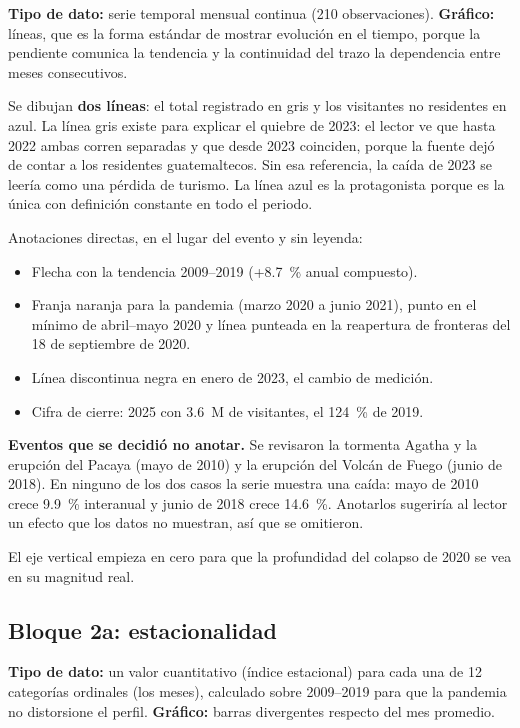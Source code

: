 \documentclass[12pt,letterpaper]{article}
\begin{document}
\textbf{Tipo de dato:} serie temporal mensual continua (210 observaciones). \textbf{Gráfico:}
líneas, que es la forma estándar de mostrar evolución en el tiempo, porque la pendiente comunica
la tendencia y la continuidad del trazo la dependencia entre meses consecutivos.

Se dibujan \textbf{dos líneas}: el total registrado en gris y los visitantes no residentes en
azul. La línea gris existe para explicar el quiebre de 2023: el lector ve que hasta 2022 ambas
corren separadas y que desde 2023 coinciden, porque la fuente dejó de contar a los residentes
guatemaltecos. Sin esa referencia, la caída de 2023 se leería como una pérdida de turismo. La
línea azul es la protagonista porque es la única con definición constante en todo el periodo.

Anotaciones directas, en el lugar del evento y sin leyenda:
\begin{itemize}[leftmargin=1.4em,itemsep=2pt]
  \item Flecha con la tendencia 2009--2019 (+8.7~\% anual compuesto).
  \item Franja naranja para la pandemia (marzo 2020 a junio 2021), punto en el mínimo de
  abril--mayo 2020 y línea punteada en la reapertura de fronteras del 18 de septiembre de 2020.
  \item Línea discontinua negra en enero de 2023, el cambio de medición.
  \item Cifra de cierre: 2025 con 3.6~M de visitantes, el 124~\% de 2019.
\end{itemize}

\textbf{Eventos que se decidió no anotar.} Se revisaron la tormenta Agatha y la erupción del
Pacaya (mayo de 2010) y la erupción del Volcán de Fuego (junio de 2018). En ninguno de los dos
casos la serie muestra una caída: mayo de 2010 crece 9.9~\% interanual y junio de 2018 crece
14.6~\%. Anotarlos sugeriría al lector un efecto que los datos no muestran, así que se omitieron.

El eje vertical empieza en cero para que la profundidad del colapso de 2020 se vea en su
magnitud real.

\subsection{Bloque 2a: estacionalidad}

\textbf{Tipo de dato:} un valor cuantitativo (índice estacional) para cada una de 12 categorías
ordinales (los meses), calculado sobre 2009--2019 para que la pandemia no distorsione el perfil.
\textbf{Gráfico:} barras divergentes respecto del mes promedio.
\end{document}
